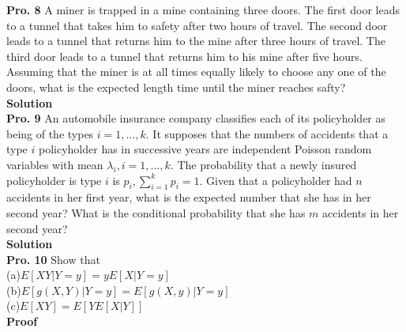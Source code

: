 \documentclass[12pt,onecolumn,journal]{IEEEtran}
\begin{document}
\textbf{Pro. 8} A miner is trapped in a mine containing three doors. The first door leads to a tunnel that takes him to safety after two hours of travel. The second door leads to a tunnel that returns him to the mine after three hours of travel. The third door leads to a tunnel that returns him to his mine after five hours. Assuming that the miner is at all times equally likely to choose any one of the doors, what is the expected length time until the miner reaches safty?
\\
\textbf{Solution}
\\

\textbf{Pro. 9} An automobile insurance company classifies each of its policyholder as being of the types $i=1,\ldots,k$. It supposes that the numbers of accidents that a type $i$ policyholder has in successive years are independent Poisson random variables with mean $\lambda_i,i=1,\ldots,k$. The probability that a newly insured policyholder is type $i$ is $p_i,\sum^k_{i=1}{p_i}=1$. Given that a policyholder had $n$ accidents in her first year, what is the expected number that she has in her second year? What is the conditional probability that she has $m$ accidents in her second year?\\
\textbf{Solution}
\\

\textbf{Pro. 10} Show that\\
\quad\quad(a)$E[XY|Y=y]=yE[X|Y=y]$\\
\quad\quad(b)$ E[g(X,Y)|Y=y]=E[g(X,y)|Y=y]$\\
\quad\quad(c)$ E[XY]=E[YE[X|Y]]$\\
\textbf{Proof}
\end{document}
